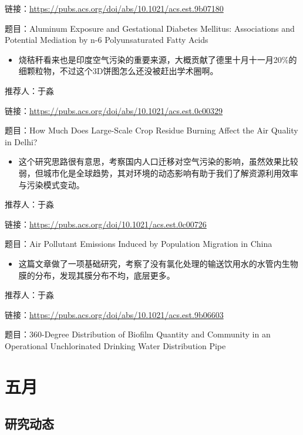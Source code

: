 \documentclass[
]{book}
\providecommand{\tightlist}{%
  \setlength{\itemsep}{0pt}\setlength{\parskip}{0pt}}
\begin{document}
链接：\url{https://pubs.acs.org/doi/abs/10.1021/acs.est.9b07180}

题目：Aluminum Exposure and Gestational Diabetes Mellitus: Associations and Potential Mediation by n-6 Polyunsaturated Fatty Acids

\begin{itemize}
\tightlist
\item
  烧秸秆看来也是印度空气污染的重要来源，大概贡献了德里十月十一月20\%的细颗粒物，不过这个3D饼图怎么还没被赶出学术圈啊。
\end{itemize}

推荐人：于淼

链接：\url{https://pubs.acs.org/doi/abs/10.1021/acs.est.0c00329}

题目：How Much Does Large-Scale Crop Residue Burning Affect the Air Quality in Delhi?

\begin{itemize}
\tightlist
\item
  这个研究思路很有意思，考察国内人口迁移对空气污染的影响，虽然效果比较弱，但城市化是全球趋势，其对环境的动态影响有助于我们了解资源利用效率与污染模式变动。
\end{itemize}

推荐人：于淼

链接：\url{https://pubs.acs.org/doi/10.1021/acs.est.0c00726}

题目：Air Pollutant Emissions Induced by Population Migration in China

\begin{itemize}
\tightlist
\item
  这篇文章做了一项基础研究，考察了没有氯化处理的输送饮用水的水管内生物膜的分布，发现其膜分布不均，底层更多。
\end{itemize}

推荐人：于淼

链接：\url{https://pubs.acs.org/doi/abs/10.1021/acs.est.9b06603}

题目：360-Degree Distribution of Biofilm Quantity and Community in an Operational Unchlorinated Drinking Water Distribution Pipe

\hypertarget{ux4e94ux6708-2}{%
\section*{五月}\label{ux4e94ux6708-2}}

\hypertarget{ux7814ux7a76ux52a8ux6001-30}{%
\subsection*{研究动态}\label{ux7814ux7a76ux52a8ux6001-30}}
\end{document}
